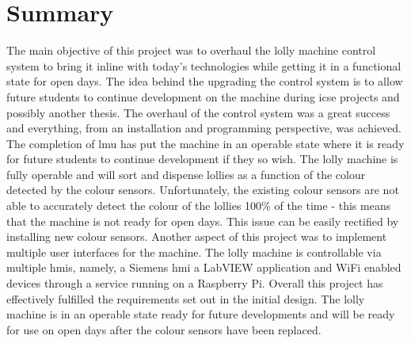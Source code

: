 \section{Summary}
    The main objective of this project was to overhaul the lolly machine control system to bring it inline with today's technologies while getting it in a functional state for open days. The idea behind the upgrading the control system is to allow future students to continue development on the machine during \acrshort{icse} projects and possibly another thesis. 
    The overhaul of the control system was a great success and everything, from an installation and programming perspective, was achieved. The completion of \acrfull{lmu} has put the machine in an operable state where it is ready for future students to continue development if they so wish. The lolly machine is fully operable and will sort and dispense lollies as a function of the colour detected by the colour sensors. Unfortunately, the existing colour sensors are not able to accurately detect the colour of the lollies 100\% of the time - this means that the machine is not ready for open days. This issue can be easily rectified by installing new colour sensors. 
    Another aspect of this project was to implement multiple user interfaces for the machine. The lolly machine is controllable via multiple \acrshort{hmi}s, namely, a Siemens \acrshort{hmi} a LabVIEW application and  WiFi enabled devices through a service running on a Raspberry Pi. 
    Overall this project has effectively fulfilled the requirements set out in the initial design. The lolly machine is in an operable state ready for future developments and will be ready for use on open days after the colour sensors have been replaced.